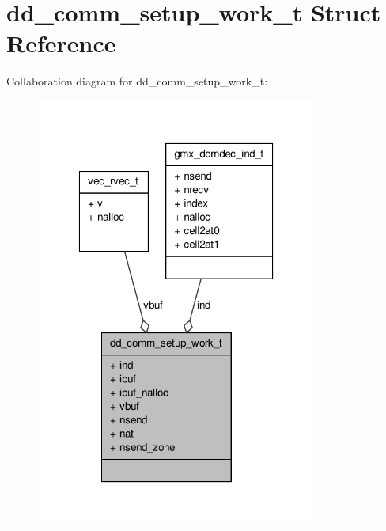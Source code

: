 \hypertarget{structdd__comm__setup__work__t}{\section{dd\-\_\-comm\-\_\-setup\-\_\-work\-\_\-t \-Struct \-Reference}
\label{structdd__comm__setup__work__t}
}


\-Collaboration diagram for dd\-\_\-comm\-\_\-setup\-\_\-work\-\_\-t\-:
\nopagebreak
\begin{figure}[H]
\begin{center}
\leavevmode
\includegraphics[width=262pt]{structdd__comm__setup__work__t__coll__graph}
\end{center}
\end{figure}
